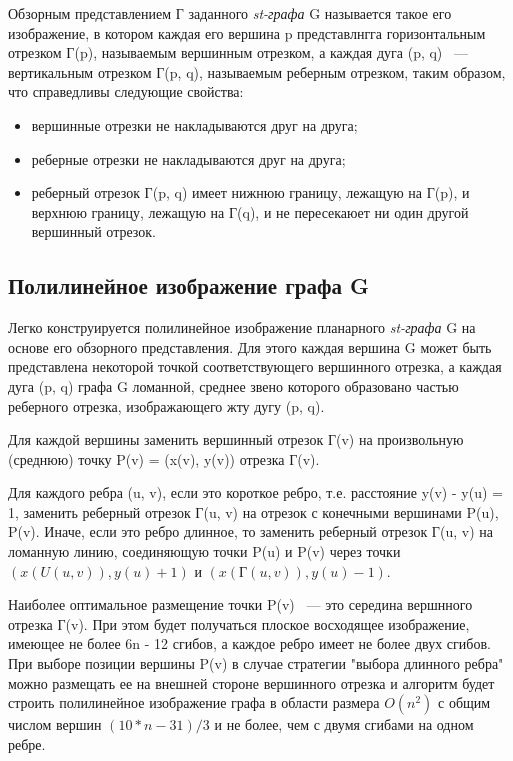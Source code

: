 
Обзорным представлением Г заданного \textit{st-графа} G называется такое его изображение, в котором каждая его вершина p представлнгга горизонтальным отрезком Г(p), называемым вершинным отрезком, а каждая дуга (p, q) ~--- вертикальным отрезком Г(p, q), называемым реберным отрезком, таким образом, что справедливы следующие свойства:
\begin{itemize}
\item вершинные отрезки не накладываются друг на друга;
\item реберные отрезки не накладываются друг на друга;
\item реберный отрезок Г(p, q) имеет нижнюю границу, лежащую на Г(p), и верхнюю границу, лежащую на Г(q), и не пересекаюет ни один другой вершинный отрезок.
\end{itemize}

\subsection{Полилинейное изображение графа G}

Легко конструируется полилинейное изображение планарного \textit{st-графа} G на основе его обзорного представления. Для этого каждая вершина G может быть представлена некоторой точкой соответствующего вершинного отрезка, а каждая дуга (p, q) графа G ломанной, среднее звено которого образовано частью реберного отрезка, изображающего жту дугу (p, q).

Для каждой вершины заменить вершинный отрезок Г(v) на произвольную (среднюю) точку P(v) = (x(v), y(v)) отрезка Г(v).

Для каждого ребра (u, v), если это короткое ребро, т.е. расстояние y(v) - y(u) = 1, заменить реберный отрезок Г(u, v) на отрезок с конечными вершинами P(u), P(v). Иначе, если это ребро длинное, то заменить реберный отрезок Г(u, v) на ломанную линию, соединяющую точки P(u) и P(v) через точки $ (x(U(u, v)), y(u) + 1) $ и $ (x(Г(u, v)), y(u) - 1) $.

Наиболее оптимальное размещение точки P(v) ~--- это середина вершнного отрезка Г(v). При этом будет получаться плоское восходящее изображение, имеющее не более 6n - 12 сгибов, а каждое ребро имеет не более двух сгибов. При выборе позиции вершины P(v) в случае стратегии "выбора длинного ребра" можно размещать ее на внешней стороне вершинного отрезка и алгоритм будет строить полилинейное изображение графа в области размера $ O(n^{2}) $ с общим числом вершин $ (10 * n - 31) / 3 $ и не более, чем с двумя сгибами на одном ребре.


